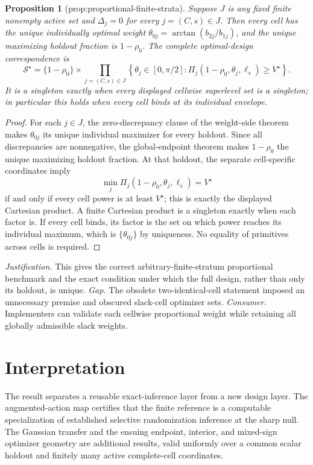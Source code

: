 \documentclass{article}
\newtheorem{proposition}{Proposition}
\begin{document}
\begin{proposition}[prop:proportional-finite-strata]\label{prop:proportional-finite-strata}
Suppose \(J\) is any fixed finite nonempty active set and \(\Delta_j=0\) for every \(j=(C,s)\in J\).  Then every cell has the unique individually optimal weight \(\theta_{0j}=\arctan(b_{2j}/b_{1j})\), and the unique maximizing holdout fraction is \(1-\rho_0\).  The complete optimal-design correspondence is
\[
\mathcal S^\star=
\{1-\rho_0\}\times
\prod_{j=(C,s)\in J}
\left\{\theta_j\in[0,\pi/2]:
\Pi_j(1-\rho_0,\theta_j,\ell_s)\ge V^\star\right\}.
\]
It is a singleton exactly when every displayed cellwise superlevel set is a singleton; in particular this holds when every cell binds at its individual envelope.
\end{proposition}
\begin{proof}
For each \(j\in J\), the zero-discrepancy clause of the weight-side theorem makes \(\theta_{0j}\) its unique individual maximizer for every holdout.  Since all discrepancies are nonnegative, the global-endpoint theorem makes \(1-\rho_0\) the unique maximizing holdout fraction.  At that holdout, the separate cell-specific coordinates imply
\[
\min_j\Pi_j(1-\rho_0,\theta_j,\ell_s)=V^\star
\]
if and only if every cell power is at least \(V^\star\); this is exactly the displayed Cartesian product.  A finite Cartesian product is a singleton exactly when each factor is.  If every cell binds, its factor is the set on which power reaches its individual maximum, which is \(\{\theta_{0j}\}\) by uniqueness.  No equality of primitives across cells is required.
\end{proof}
\par\smallskip\noindent \textit{Justification.} This gives the correct arbitrary-finite-stratum proportional benchmark and the exact condition under which the full design, rather than only its holdout, is unique. \textit{Gap.} The obsolete two-identical-cell statement imposed an unnecessary premise and obscured slack-cell optimizer sets. \textit{Consumer.} Implementers can validate each cellwise proportional weight while retaining all globally admissible slack weights.

\section{Interpretation}

The result separates a reusable exact-inference layer from a new design layer. The augmented-action map certifies that the finite reference is a computable specialization of established selective randomization inference at the sharp null. The Gaussian transfer and the ensuing endpoint, interior, and mixed-sign optimizer geometry are additional results, valid uniformly over a common scalar holdout and finitely many active complete-cell coordinates.
\end{document}
